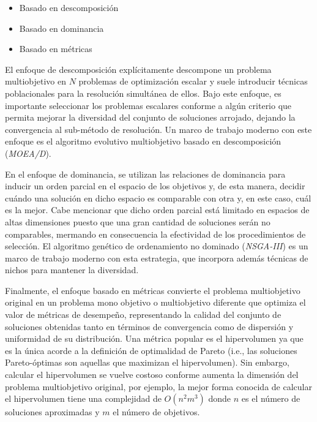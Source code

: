 \documentclass[letterpaper,10pt]{article}
\begin{document}
\begin{itemize}
 \item Basado en descomposición
 \item Basado en dominancia
 \item Basado en métricas
\end{itemize}

El enfoque de descomposición explícitamente descompone un problema multiobjetivo en $N$ problemas de optimización escalar y suele introducir técnicas poblacionales para
la resolución simultánea de ellos. Bajo este enfoque, es importante seleccionar los problemas escalares conforme a algún criterio que permita mejorar la diversidad del conjunto
de soluciones arrojado, dejando la convergencia al sub-método de resolución. Un marco de trabajo moderno con este enfoque es el algoritmo evolutivo multiobjetivo basado en
descomposición (\emph{MOEA/D})\cite{4358754}.
\newline

En el enfoque de dominancia, se utilizan las relaciones de dominancia para inducir un orden parcial en el espacio de los objetivos y, de esta manera, decidir cuándo una solución
en dicho espacio es comparable con otra y, en este caso, cuál es la mejor. Cabe mencionar que dicho orden parcial está limitado en espacios de altas dimensiones puesto que una gran
cantidad de soluciones serán no comparables, mermando en consecuencia la efectividad de los procedimientos de selección. El algoritmo genético de ordenamiento no dominado
(\emph{NSGA-III})\cite{6600851} es un marco de trabajo moderno con esta estrategia, que incorpora además técnicas de nichos para mantener la diversidad.
\newline

Finalmente, el enfoque basado en métricas convierte el problema multiobjetivo original en un problema mono objetivo o multiobjetivo diferente que optimiza el valor de métricas de desempeño,
representando la calidad del conjunto de soluciones obtenidas tanto en términos de convergencia como de dispersión y uniformidad de su distribución. Una métrica popular
es el hipervolumen ya que es la única acorde a la definición de  optimalidad de Pareto (i.e., las soluciones Pareto-óptimas son aquellas que maximizan el hipervolumen).
Sin embargo, calcular el hipervolumen se vuelve costoso conforme aumenta la dimensión del problema multiobjetivo original, por ejemplo, la mejor forma conocida de calcular
el hipervolumen tiene una complejidad de $O(n^2m^3)$ donde $n$ es el número de soluciones aproximadas y $m$ el número de objetivos.
\newline
\end{document}
